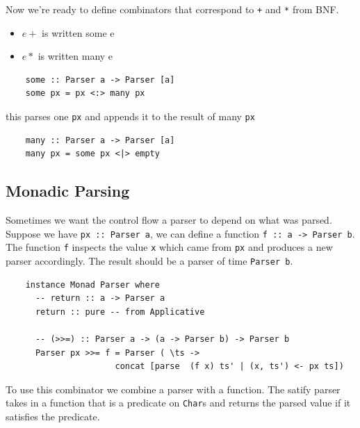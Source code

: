 \documentclass[a4paper,12pt]{article}
\theoremstyle{remark}
\begin{document}
Now we're ready to define combinators that correspond to \lstinline{+} and \lstinline{*} from BNF.
\begin{itemize}
  \item $e+$ is written some e
  \item $e*$ is written many e
\end{itemize}

\begin{lstlisting}
    some :: Parser a -> Parser [a]
    some px = px <:> many px  \end{lstlisting}

this parses one \lstinline{px} and appends it to the result of many \lstinline{px}

\begin{lstlisting}
    many :: Parser a -> Parser [a]
    many px = some px <|> empty  \end{lstlisting}

\subsection{Monadic Parsing}

Sometimes we want the control flow a parser to depend on what was parsed. Suppose
we have \lstinline{px :: Parser a}, we can define a function \lstinline{f :: a -> Parser b}. The function
\lstinline{f} inspects the value \lstinline{x} which came from \lstinline{px} and produces a new parser accordingly.
The result should be a parser of time \lstinline{Parser b}.

\begin{lstlisting}
    instance Monad Parser where
      -- return :: a -> Parser a
      return :: pure -- from Applicative

      -- (>>=) :: Parser a -> (a -> Parser b) -> Parser b
      Parser px >>= f = Parser ( \ts ->
                      concat [parse  (f x) ts' | (x, ts') <- px ts])  \end{lstlisting}

\begin{figure}[H]
  \centering
\end{figure}

To use this combinator we combine a parser with a function. The satify parser takes
in a function that is a predicate on \lstinline{Char}s and returns the parsed value if it
satisfies the predicate.
\end{document}
